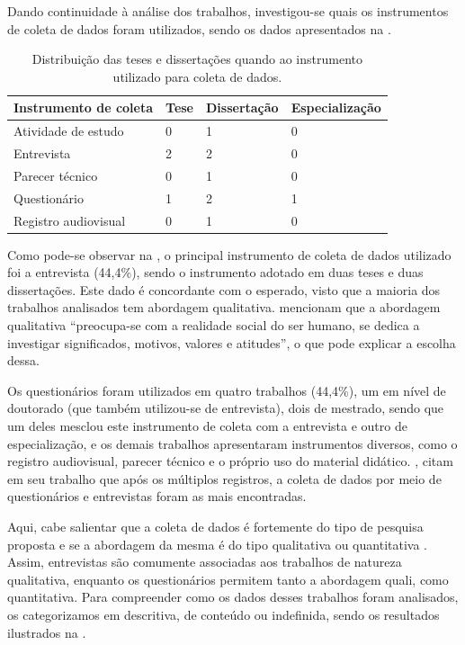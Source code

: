 Dando continuidade à análise dos trabalhos, investigou-se quais os
instrumentos de coleta de dados foram utilizados, sendo os dados
apresentados na .

\begin{table}
\centering
\begin{threeparttable}
\caption{Distribuição das teses e dissertações quando ao instrumento utilizado para coleta de dados.}\label{tab-02}
\begin{tabular}{llll}
\toprule
Instrumento de coleta & Tese & Dissertação & Especialização\\
\midrule		
Atividade de estudo & 0 & 1 & 0 \\
Entrevista & 2 & 2 & 0 \\
Parecer técnico & 0 & 1 & 0 \\
Questionário & 1 & 2 & 1 \\
Registro audiovisual & 0 & 1 & 0 \\
\bottomrule		
\end{tabular}
\end{threeparttable}
\end{table}

Como pode-se observar na , o principal instrumento de coleta de
dados utilizado foi a entrevista (44,4\%), sendo o instrumento adotado
em duas teses e duas dissertações. Este dado é concordante com o
esperado, visto que a maioria dos trabalhos analisados tem abordagem
qualitativa. \textcite[p.~1417]{BrancoPinto2022} mencionam que a abordagem
qualitativa ``preocupa-se com a realidade social do ser humano, se
dedica a investigar significados, motivos, valores e atitudes'', o que
pode explicar a escolha dessa.

Os questionários foram utilizados em quatro trabalhos (44,4\%), um em
nível de doutorado (que também utilizou-se de entrevista), dois de
mestrado, sendo que um deles mesclou este instrumento de coleta com a
entrevista e outro de especialização, e os demais trabalhos apresentaram
instrumentos diversos, como o registro audiovisual, parecer técnico e o
próprio uso do material didático. \textcite{minuzzi2020}, citam em
seu trabalho que após os múltiplos registros, a coleta de dados por meio
de questionários e entrevistas foram as mais encontradas.

Aqui, cabe salientar que a coleta de dados é fortemente do tipo de
pesquisa proposta e se a abordagem da mesma é do tipo qualitativa ou
quantitativa \cite{Strauss2008}. Assim, entrevistas são comumente
associadas aos trabalhos de natureza qualitativa, enquanto os
questionários permitem tanto a abordagem quali, como quantitativa. Para
compreender como os dados desses trabalhos foram analisados, os
categorizamos em descritiva, de conteúdo ou indefinida, sendo os
resultados ilustrados na .

